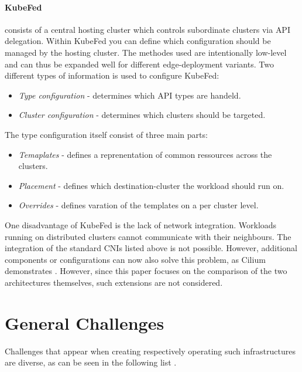 \documentclass[MSC,Master,english]{twbook}%
\begin{document}
\paragraph{\ac{KubeFed}} consists of a central hosting cluster which controls subordinate clusters via \ac{API} delegation. Within \ac{KubeFed} you can define which configuration should be managed by the hosting cluster. The methodes used are intentionally low-level and can thus be expanded well for different edge-deployment variants. Two different types of information is used to configure \ac{KubeFed}\cite{kubefed-github}:

\begin{itemize}
    \item \textit{Type configuration} - determines which \ac{API} types are handeld.
    \item \textit{Cluster configuration} - determines which clusters should be targeted.
\end{itemize}

The type configuration itself consist of three main parts:

\begin{itemize}
    \item \textit{Temaplates} - defines a reprenentation of common ressources across the clusters.
    \item \textit{Placement} - defines which destination-cluster the workload should run on.
    \item \textit{Overrides} - defines varation of the templates on a per cluster level.
\end{itemize}

One disadvantage of KubeFed is the lack of network integration. Workloads running on distributed clusters cannot communicate with their neighbours. The integration of the standard CNIs listed above is not possible. However, additional components or configurations can now also solve this problem, as Cilium demonstrates \cite{ciliummesh}. However, since this paper focuses on the comparison of the two architectures themselves, such extensions are not considered.

\section{General Challenges} 
\label{sec:generalchallanges}
Challenges that appear when creating respectively operating such infrastructures are diverse, as can be seen in the following list \cite{intro-edge}.
\end{document}
